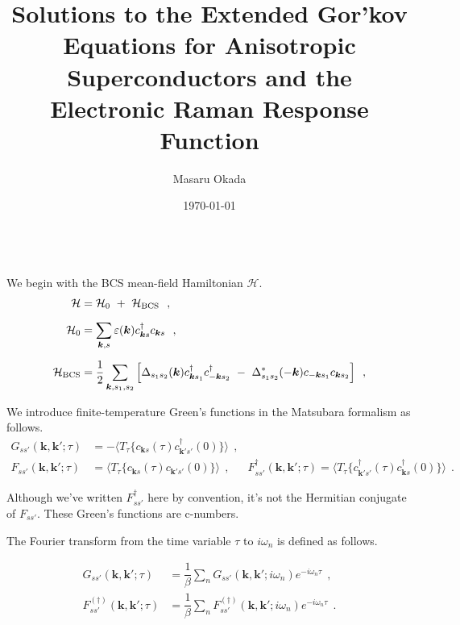 \documentclass[a4j]{jsarticle}
\title{
Solutions to the Extended Gor'kov Equations for Anisotropic Superconductors and the Electronic Raman Response Function
}
\author{Masaru Okada}
\date{\today}
\begin{document}
\maketitle

\ \\[-15mm]

We begin with the BCS mean-field Hamiltonian $\mathcal{H}$.
\begin{align}
	\mathcal{H}
	 & =
	\mathcal{H}_{0}
	\ + \
	\mathcal{H}_{\rm BCS}
	\ \ ,
	\nonumber \\[2mm]
	\mathcal{H}_{0}
	 & =
	\sum_{\bm{k},s}
	\varepsilon(\bm{k})
	c_{\bm{k} s}^{\dagger}
	c_{\bm{k} s}
	\ \ ,
	\nonumber \\[2mm]
	\mathcal{H}_{\rm BCS}
	 & =
	\dfrac{1}{2}
	\sum_{\bm{k},s_{1},s_{2}}
	\Big[
		\Delta_{ s_{1} s_{2} }( \bm{k} )
		c_{\bm{k} s_{1}}^{\dagger}
		c_{-\bm{k} s_{2}}^{\dagger}
		\ - \
		\Delta_{ s_{1} s_{2} }^{*}( - \bm{k} )
		c_{-\bm{k} s_{1}}
		c_{\bm{k} s_{2}}
		\Big]
	\ \ ,
\end{align}

We introduce finite-temperature Green's functions in the Matsubara formalism as follows.
\begin{align}
	G_{ss'}(\bm{k} , \bm{k}' ; \tau)
	 & =
	-
	\langle T_{\tau} \{ c_{\bm{k}s}(\tau) c_{\bm{k}'s'}^{\dagger}(0) \} \rangle
	\ \ ,
	 &                                            \\[3mm]
	F_{ss'}(\bm{k} , \bm{k}' ; \tau)
	 & =
	\langle T_{\tau} \{ c_{\bm{k}s}(\tau) c_{\bm{k}'s'}(0) \} \rangle
	\ \ , \ \
	 & F_{ss'}^{\dagger}(\bm{k} , \bm{k}' ; \tau)
	=
	\langle T_{\tau} \{ c_{\bm{k}' s' }^{\dagger}(\tau) c_{\bm{k} s }^{\dagger}(0) \} \rangle
	\ \ .
\end{align}

Although we've written $F_{ss'}^{\dagger}$ here by convention, it's not the Hermitian conjugate of $F_{ss'}$.
These Green's functions are c-numbers.

The Fourier transform from the time variable $\tau$ to $i \omega_{n}$ is defined as follows.

\begin{align}
	G_{ss'}(\bm{k} , \bm{k}' ; \tau)
	 & =
	\dfrac{1}{\beta} \sum_{n}
	G_{ss'}(\bm{k} , \bm{k}' ; i \omega_{n} )
	e^{- i \omega_{n} \tau }
	\ \ , \nonumber \\[2mm]
	F_{ss'}^{(\dagger)}(\bm{k} , \bm{k}' ; \tau)
	 & =
	\dfrac{1}{\beta} \sum_{n}
	F_{ss'}^{(\dagger)}(\bm{k} , \bm{k}' ; i \omega_{n} )
	e^{- i \omega_{n} \tau }
	\ \ .
\end{align}
\end{document}
